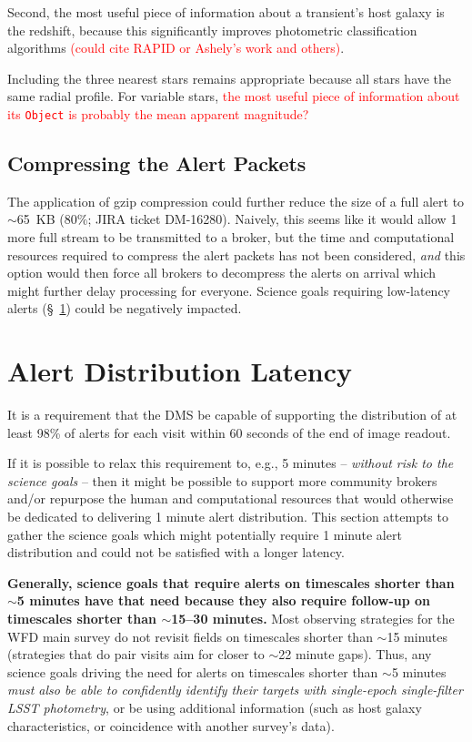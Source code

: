 \documentclass[DM,lsstdraft,authoryear,toc]{lsstdoc}
\begin{document}
Second, the most useful piece of information about a transient's host galaxy is the redshift, because this significantly improves photometric classification algorithms \textcolor{red}{(could cite RAPID or Ashely's work and others)}. 

Including the three nearest stars remains appropriate because all stars have the same radial profile. For variable stars, \textcolor{red}{the most useful piece of information about its {\tt Object} is probably the mean apparent magnitude?}


\subsection{Compressing the Alert Packets}\label{ssec:packets_compress}

The application of gzip compression could further reduce the size of a full alert to $\sim$65~KB (80\%; JIRA ticket DM-16280). Naively, this seems like it would allow 1 more full stream to be transmitted to a broker, but the time and computational resources required to compress the alert packets has not been considered, \emph{and} this option would then force all brokers to decompress the alerts on arrival which might further delay processing for everyone. Science goals requiring low-latency alerts (\S~\ref{sec:latency}) could be negatively impacted.


\clearpage
\section{Alert Distribution Latency} \label{sec:latency}

It is a requirement that the DMS be capable of supporting the distribution of at least 98\% of alerts for each visit within 60 seconds of the end of image readout.

If it is possible to relax this requirement to, e.g., 5 minutes -- \emph{without risk to the science goals} -- then it might be possible to support more community brokers and/or repurpose the human and computational resources that would otherwise be dedicated to delivering 1 minute alert distribution. This section attempts to gather the science goals which might potentially require 1 minute alert distribution and could not be satisfied with a longer latency.

{\bf Generally, science goals that require alerts on timescales shorter than $\sim$5 minutes have that need because they also require follow-up on timescales shorter than $\sim$15--30 minutes.} Most observing strategies for the WFD main survey do not revisit fields on timescales shorter than $\sim$15 minutes (strategies that do pair visits aim for closer to $\sim$22 minute gaps). Thus, any science goals driving the need for alerts on timescales shorter than $\sim$5 minutes \emph{must also be able to confidently identify their targets with single-epoch single-filter LSST photometry}, or be using additional information (such as host galaxy characteristics, or coincidence with another survey's data).
\end{document}
